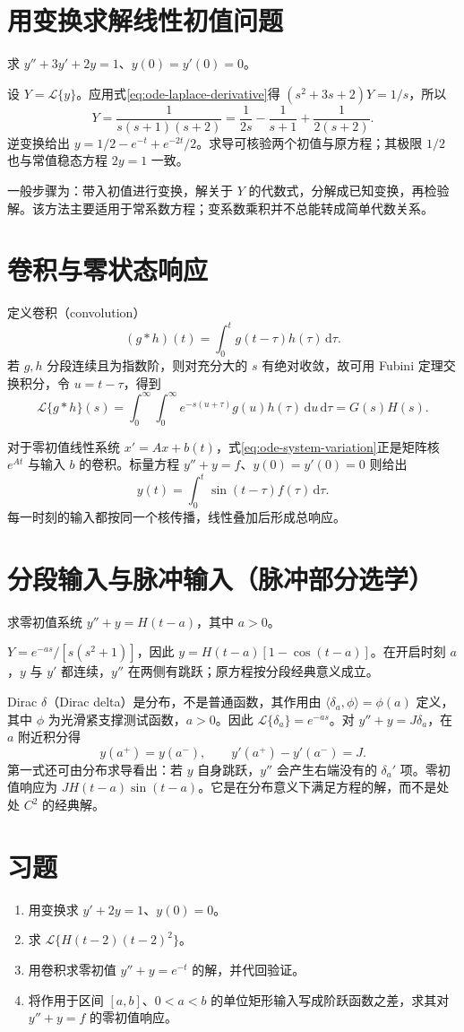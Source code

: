\section{用变换求解线性初值问题}
\begin{example}
求 $y''+3y'+2y=1$、$y(0)=y'(0)=0$。
\end{example}
\begin{solve}
设 $Y=\mathcal L\{y\}$。应用式\eqref{eq:ode-laplace-derivative}得 $(s^2+3s+2)Y=1/s$，所以
\[
 Y=\frac{1}{s(s+1)(s+2)}=\frac1{2s}-\frac1{s+1}+\frac1{2(s+2)}.
\]
逆变换给出 $y=1/2-e^{-t}+e^{-2t}/2$。求导可核验两个初值与原方程；其极限 $1/2$ 也与常值稳态方程 $2y=1$ 一致。
\end{solve}

一般步骤为：带入初值进行变换，解关于 $Y$ 的代数式，分解成已知变换，再检验解。该方法主要适用于常系数方程；变系数乘积并不总能转成简单代数关系。

\section{卷积与零状态响应}
定义卷积（convolution）
\[
 (g*h)(t)=\int_0^t g(t-\tau)h(\tau)\,\mathrm d\tau.
\]
若 $g,h$ 分段连续且为指数阶，则对充分大的 $s$ 有绝对收敛，故可用 Fubini 定理交换积分，令 $u=t-\tau$，得到
\[
 \mathcal L\{g*h\}(s)
 =\int_0^\infty\int_0^\infty e^{-s(u+\tau)}g(u)h(\tau)\,\mathrm du\,\mathrm d\tau
 =G(s)H(s).
\]

对于零初值线性系统 $x'=Ax+b(t)$，式\eqref{eq:ode-system-variation}正是矩阵核 $e^{At}$ 与输入 $b$ 的卷积。标量方程 $y''+y=f$、$y(0)=y'(0)=0$ 则给出
\[
 y(t)=\int_0^t\sin(t-\tau)f(\tau)\,\mathrm d\tau.
\]
每一时刻的输入都按同一个核传播，线性叠加后形成总响应。

\section{分段输入与脉冲输入（脉冲部分选学）}
\begin{example}
求零初值系统 $y''+y=H(t-a)$，其中 $a>0$。
\end{example}
\begin{solve}
$Y=e^{-as}/[s(s^2+1)]$，因此 $y=H(t-a)[1-\cos(t-a)]$。在开启时刻 $a$，$y$ 与 $y'$ 都连续，$y''$ 在两侧有跳跃；原方程按分段经典意义成立。
\end{solve}

Dirac $\delta$（Dirac delta）是分布，不是普通函数，其作用由 $\langle\delta_a,\phi\rangle=\phi(a)$ 定义，其中 $\phi$ 为光滑紧支撑测试函数，$a>0$。因此 $\mathcal L\{\delta_a\}=e^{-as}$。对 $y''+y=J\delta_a$，在 $a$ 附近积分得
\[
 y(a^+)=y(a^-),\qquad y'(a^+)-y'(a^-)=J.
\]
第一式还可由分布求导看出：若 $y$ 自身跳跃，$y''$ 会产生右端没有的 $\delta_a'$ 项。零初值响应为 $JH(t-a)\sin(t-a)$。它是在分布意义下满足方程的解，而不是处处 $C^2$ 的经典解。

\section{习题}
\begin{enumerate}
 \item\label{ex:ode-laplace} 用变换求 $y'+2y=1$、$y(0)=0$。
 \item\label{ex:ode-delay} 求 $\mathcal L\{H(t-2)(t-2)^2\}$。
 \item 用卷积求零初值 $y''+y=e^{-t}$ 的解，并代回验证。
 \item 将作用于区间 $[a,b]$、$0<a<b$ 的单位矩形输入写成阶跃函数之差，求其对 $y''+y=f$ 的零初值响应。
\end{enumerate}

